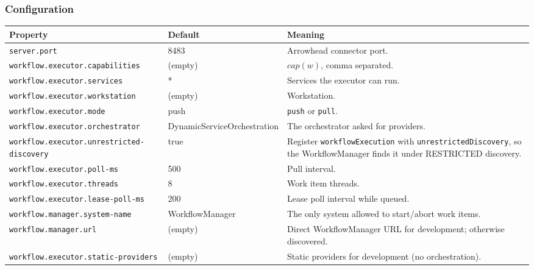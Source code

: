 \documentclass[a4paper]{arrowhead}
\begin{document}
\subsubsection{Configuration}

{\small
\begin{longtable}{|p{5.6cm}|p{3.4cm}|p{6.8cm}|}

\hline
\rowcolor{gray!33} Property & Default & Meaning \\ \hline
\endhead
\texttt{server.\allowbreak{}port} & 8483 & Arrowhead connector port. \\ \hline
\texttt{workflow.\allowbreak{}executor.\allowbreak{}capabilities} & (empty) & $cap(w)$, comma separated. \\ \hline
\texttt{workflow.\allowbreak{}executor.\allowbreak{}services} & * & Services the executor can run. \\ \hline
\texttt{workflow.\allowbreak{}executor.\allowbreak{}workstation} & (empty) & Workstation. \\ \hline
\texttt{workflow.\allowbreak{}executor.\allowbreak{}mode} & push & \texttt{push} or \texttt{pull}. \\ \hline
\texttt{workflow.\allowbreak{}executor.\allowbreak{}orchestrator} & DynamicServiceOrchestration & The orchestrator asked for providers. \\ \hline
\texttt{workflow.\allowbreak{}executor.\allowbreak{}unrestricted-\allowbreak{}discovery} & true & Register \texttt{workflowExecution} with \texttt{unrestrictedDiscovery}, so the WorkflowManager finds it under RESTRICTED discovery. \\ \hline
\texttt{workflow.\allowbreak{}executor.\allowbreak{}poll-\allowbreak{}ms} & 500 & Pull interval. \\ \hline
\texttt{workflow.\allowbreak{}executor.\allowbreak{}threads} & 8 & Work item threads. \\ \hline
\texttt{workflow.\allowbreak{}executor.\allowbreak{}lease-\allowbreak{}poll-\allowbreak{}ms} & 200 & Lease poll interval while queued. \\ \hline
\texttt{workflow.\allowbreak{}manager.\allowbreak{}system-\allowbreak{}name} & WorkflowManager & The only system allowed to start/abort work items. \\ \hline
\texttt{workflow.\allowbreak{}manager.\allowbreak{}url} & (empty) & Direct WorkflowManager URL for development; otherwise discovered. \\ \hline
\texttt{workflow.\allowbreak{}executor.\allowbreak{}static-\allowbreak{}providers} & (empty) & Static providers for development (no orchestration). \\ \hline

\end{longtable}}
\end{document}
